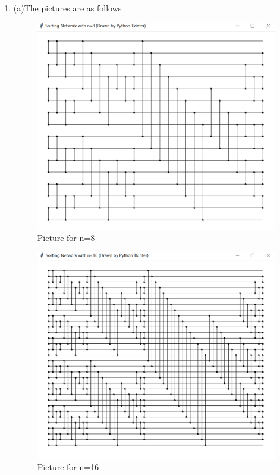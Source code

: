 \documentclass[12pt,a4paper]{article}
\makeatletter
\newtheorem*{solution}{Solution}
\theoremstyle{definition}
\renewenvironment{solution}[1][Solution] {\par\pushQED{\qed}\normalfont\topsep6\p@\@plus6\p@\relax\trivlist\item[\hskip\labelsep\bfseries#1\@addpunct{.}]\ignorespaces}{\popQED\endtrivlist\@endpefalse} \makeatother
\makeatother
\begin{document}
\begin{enumerate}
\begin{solution}
		(a)The pictures are as follows
		 \begin{figure}[htbp]
			\centering
			\includegraphics[width=12cm]{8.PNG}
			\caption{Picture for n=8 }
			\label{fig1}
		\end{figure} 
	 \begin{figure}[htbp]
		\centering
		\includegraphics[width=12cm]{16.PNG}
		\caption{Picture for n=16 }
		\label{fig2}
			\end{figure} 
		

\end{solution}
\end{enumerate}
\end{document}
